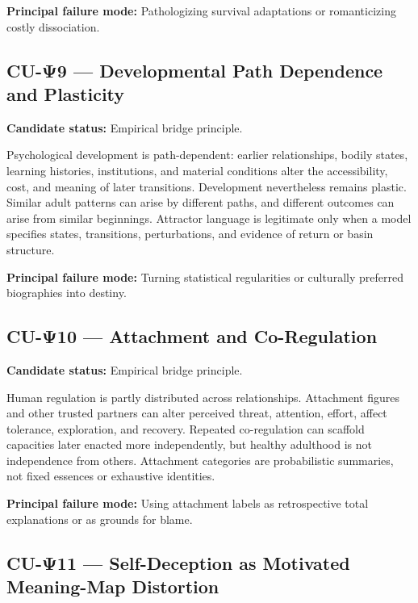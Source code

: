 \documentclass[
  11pt,
]{article}
\begin{document}
\textbf{Principal failure mode:} Pathologizing survival adaptations or
romanticizing costly dissociation.

\subsection{CU-Ψ9 --- Developmental Path Dependence and
Plasticity}\label{cu-ux3c89-developmental-path-dependence-and-plasticity}

\textbf{Candidate status:} Empirical bridge principle.

Psychological development is path-dependent: earlier relationships,
bodily states, learning histories, institutions, and material conditions
alter the accessibility, cost, and meaning of later transitions.
Development nevertheless remains plastic. Similar adult patterns can
arise by different paths, and different outcomes can arise from similar
beginnings. Attractor language is legitimate only when a model specifies
states, transitions, perturbations, and evidence of return or basin
structure.

\textbf{Principal failure mode:} Turning statistical regularities or
culturally preferred biographies into destiny.

\subsection{CU-Ψ10 --- Attachment and
Co-Regulation}\label{cu-ux3c810-attachment-and-co-regulation}

\textbf{Candidate status:} Empirical bridge principle.

Human regulation is partly distributed across relationships. Attachment
figures and other trusted partners can alter perceived threat,
attention, effort, affect tolerance, exploration, and recovery. Repeated
co-regulation can scaffold capacities later enacted more independently,
but healthy adulthood is not independence from others. Attachment
categories are probabilistic summaries, not fixed essences or exhaustive
identities.

\textbf{Principal failure mode:} Using attachment labels as
retrospective total explanations or as grounds for blame.

\subsection{CU-Ψ11 --- Self-Deception as Motivated Meaning-Map
Distortion}\label{cu-ux3c811-self-deception-as-motivated-meaning-map-distortion}
\end{document}

